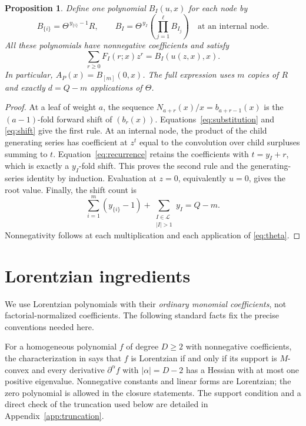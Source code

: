 \documentclass[11pt,letterpaper]{article}
\newtheorem{proposition}[theorem]{Proposition}
\theoremstyle{definition}
\theoremstyle{remark}
\newcommand{\cL}{\mathcal{L}}
\begin{document}
\begin{proposition}\label{prop:finite}
Define one polynomial $B_I(u,x)$ for each node by
\begin{equation}\label{eq:tree-expression}
 B_{\{i\}}=\Theta^{\,y_{\{i\}}-1}R,
 \qquad
 B_I=\Theta^{\,y_I}\left(\prod_{j=1}^{\ell}B_{I_j}\right)
 \quad\text{at an internal node.}
\end{equation}
All these polynomials have nonnegative coefficients and satisfy
\[
 \sum_{r\geq0}F_I(r;x)z^r=B_I(u(z,x),x).
\]
In particular, $A_P(x)=B_{[m]}(0,x)$. The full expression uses $m$ copies of $R$ and exactly $d=Q-m$ applications of $\Theta$.
\end{proposition}
\begin{proof}
At a leaf of weight $a$, the sequence $N_{a+r}(x)/x=b_{a+r-1}(x)$ is the $(a-1)$-fold forward shift of $(b_r(x))$. Equations~\eqref{eq:substitution} and \eqref{eq:shift} give the first rule. At an internal node, the product of the child generating series has coefficient at $z^t$ equal to the convolution over child surpluses summing to $t$. Equation~\eqref{eq:recurrence} retains the coefficients with $t=y_I+r$, which is exactly a $y_I$-fold shift. This proves the second rule and the generating-series identity by induction. Evaluation at $z=0$, equivalently $u=0$, gives the root value. Finally, the shift count is
\[
 \sum_{i=1}^m(y_{\{i\}}-1)+\sum_{\substack{I\in\cL\\|I|>1}}y_I=Q-m.
\]
Nonnegativity follows at each multiplication and each application of \eqref{eq:theta}.
\end{proof}

\section{Lorentzian ingredients}
We use Lorentzian polynomials with their \emph{ordinary monomial coefficients}, not factorial-normalized coefficients. The following standard facts fix the precise conventions needed here.

For a homogeneous polynomial $f$ of degree $D\geq2$ with nonnegative coefficients, the characterization in \cite[Theorem 2.25]{BH2020} says that $f$ is Lorentzian if and only if its support is $M$-convex and every derivative $\partial^\alpha f$ with $|\alpha|=D-2$ has a Hessian with at most one positive eigenvalue. Nonnegative constants and linear forms are Lorentzian; the zero polynomial is allowed in the closure statements. The support condition and a direct check of the truncation used below are detailed in Appendix~\ref{app:truncation}.
\end{document}
